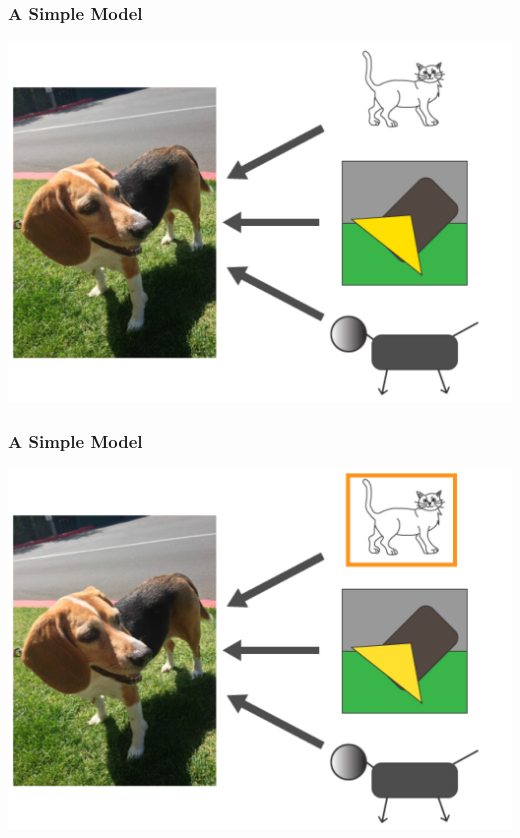 \documentclass[12pt, block=fill]{beamer}
\begin{document}
\begin{frame}
  \frametitle{A Simple Model}
  \begin{center}
    \includegraphics[width=0.9\linewidth]{figures/model_c.png}     
  \end{center}
\end{frame}

\begin{frame}
  \frametitle{A Simple Model}
  \begin{center}
    \includegraphics[width=0.9\linewidth]{figures/model_c1.png}     
  \end{center}
\end{frame}
\end{document}
